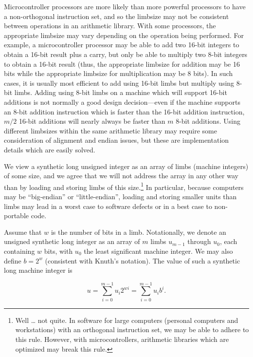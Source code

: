 Microcontroller processors are more likely than more powerful processors to have
a non-orthogonal instruction set, and so the limbsize may not be consistent between
operations in an arithmetic library.
With some processors, the appropriate limbsize may vary depending on the operation being
performed.  
For example, a microcontroller processor may be able to add two 16-bit integers to
obtain a 16-bit result plus a carry, but only be able to multiply two 8-bit integers to 
obtain a 16-bit result (thus, the appropriate limbsize for addition may be 
16 bits while the appropriate limbsize for multiplication may be 8 bits).
In such cases, it is usually most efficient to add using 16-bit limbs but
multiply using 8-bit limbs.  Adding using 8-bit limbs on a machine which will
support 16-bit additions is not normally a good design decision---even if the 
machine supports an 8-bit addition instruction which is faster than the 16-bit addition
instruction, $m/2$ 16-bit additions will nearly always be faster than 
$m$ 8-bit additions.  Using different limbsizes within the same arithmetic library
may require some consideration of alignment and 
endian issues, but these are implementation details
which are easily solved.

We view a synthetic long unsigned integer as an array of limbs (machine integers)
of some size, and we agree that we will not address the array in any other way than
by loading and storing limbs of this size.\footnote{Well \ldots{} not quite.
In software for large computers (personal computers and workstations) with an
orthogonal instruction set, we may be able to adhere to this rule.  However,
with microcontrollers, arithmetic libraries which are optimized
may break this rule.}  In particular, because
computers may be ``big-endian'' or ``little-endian'', loading and storing 
smaller units than limbs may lead in
a worst case to software defects or in a best case to non-portable code.

Assume that $w$ is the number of bits in a limb.
Notationally, we denote an unsigned
synthetic long integer as an array of $m$ limbs
$u_{m-1}$ through $u_0$, each containing $w$ bits,
with $u_0$ the least significant machine integer.  
We may also define $b=2^w$ (consistent with Knuth's
notation).
The value of
such a synthetic long machine integer is

\begin{equation}
\label{eq:ccil0:sroi0:srou0:02}
u = \sum_{i=0}^{m-1} u_{i} 2^{wi} 
=
\sum_{i=0}^{m-1} u_{i} b^i.
\end{equation}

